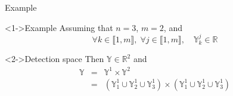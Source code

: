 \documentclass{beamer}
\begin{document}
        \begin{frame}{Example}
            \begin{exampleblock}<1->{Example}
                Assuming that $n = 3$, $m = 2$, and
                $$\forall k \in \llbracket 1, m\rrbracket, \;  \forall j \in \llbracket 1, m\rrbracket, \quad \mathbb{Y}_k^j \in \mathbb{R}$$
            \end{exampleblock}
            \begin{exampleblock}<2->{Detection space}
                Then $\mathbb{Y} \in \mathbb{R}^2$ and
                \begin{eqnarray}
                    \mathbb{Y} & = & \mathbb{Y}^1 \times \mathbb{Y}^2 \\
                    & = & \left(\mathbb{Y}_1^1 \cup \mathbb{Y}_2^1 \cup \mathbb{Y}_3^1\right) \times \left(\mathbb{Y}_1^1 \cup \mathbb{Y}_2^1 \cup \mathbb{Y}_3^1\right)
                \end{eqnarray}
            \end{exampleblock}
        \end{frame}
\end{document}
